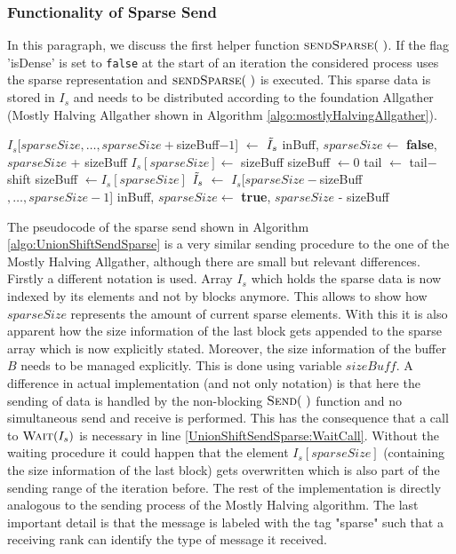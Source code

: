 \subsubsection{Functionality of Sparse Send}
In this paragraph, we discuss the first helper function $\Call{sendSparse}{~}$. If the flag 'isDense' is set to \texttt{false} at the start of an iteration the considered process uses the sparse representation and $\Call{sendSparse}{~}$ is executed. This sparse data is stored in $I_s$ and needs to be distributed according to the foundation Allgather (Mostly Halving Allgather shown in Algorithm \ref{algo:mostlyHalvingAllgather}). 
\begin{algorithm}[htb]
	\caption{Send sparse representation.} \label{algo:UnionShiftSendSparse}
	\begin{algorithmic}[1]
			  \label{UnionShiftSendSparse:OnPile}
				\State {} \label{UnionShiftSendSparse:WaitCall}
				\State $I_s$[$sparseSize, \dots, sparseSize + $sizeBuff$ - 1$] $\gets$ $\Tilde{I}_s$
				\State inBuff, $sparseSize \gets$ \textbf{false}, $sparseSize$ + sizeBuff
				\State $I_s[sparseSize] \gets $ sizeBuff 
				\State sizeBuff $\gets 0$ 
			\EndIf
			\State tail $\gets$ tail$ - $shift
		\Else
			  
				\State sizeBuff $\gets I_s[sparseSize]$			
				\State $\Tilde{I}_s$ $\gets$ $I_s$[$sparseSize-$sizeBuff$, \dots,sparseSize-1$]
				\State inBuff, $sparseSize \gets$ \textbf{true},  $sparseSize$ - sizeBuff
			\EndIf
		\EndIf
		\State {}
		\EndProcedure
	\end{algorithmic}
\end{algorithm}
The pseudocode of the sparse send shown in Algorithm \ref{algo:UnionShiftSendSparse} is a very similar sending procedure to the one of the Mostly Halving Allgather, although there are small but relevant differences. Firstly a different notation is used. Array $I_s$ which holds the sparse data is now indexed by its elements and not by blocks anymore. This allows to show how $sparseSize$ represents the amount of current sparse elements. With this it is also apparent how the size information of the last block gets appended to the sparse array which is now explicitly stated. Moreover, the size information of the buffer $B$ needs to be managed explicitly. This is done using variable $sizeBuff$.  A difference in actual implementation (and not only notation) is that here the sending of data is handled by the non-blocking $\Call{Send}{~}$ function and no simultaneous send and receive is performed. This has the consequence that  a call to $\Call{Wait}{I_s}$ is necessary in line \ref{UnionShiftSendSparse:WaitCall}. Without the waiting procedure it could happen that the element $I_s[sparseSize]$ (containing the size information of the last block) gets overwritten which is also part of the sending range of the iteration before. The rest of the implementation is directly analogous to the sending process of the Mostly Halving algorithm. The last important detail is that the message is labeled with the tag "sparse" such that a receiving rank can identify the type of message it received.

